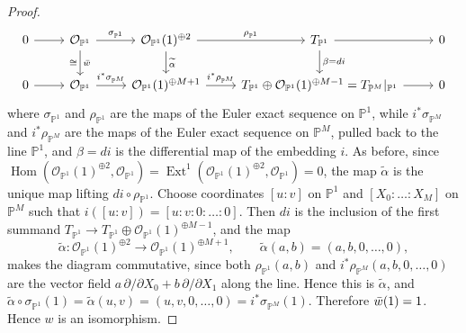 \documentclass[11pt,twoside]{amsart}
\theoremstyle{plain}
\theoremstyle{definition}
\newcommand{\PP}{\mathbb{P}}
\newcommand{\PM}{\mathbb{P}^M}
\newcommand{\OO}{\mathcal{O}}
\newcommand{\Hom}{\operatorname{Hom}}
\newcommand{\Ext}{\operatorname{Ext}}
\begin{document}
\begin{proof}
\[
\begin{tikzcd}
  0 \arrow[r] & \OO_{\PP^1} \arrow[r, "\sigma_{\PP^1}"] \arrow[d, "\Bar{w}", "\cong"'] & \OO_{\PP^1}(1)^{\oplus 2} \arrow[r, "\rho_{\PP^1}"] \arrow[d, "\widetilde{\alpha}"] & T_{\PP^1} \arrow[r] \arrow[d, "\beta = di"] & 0 \\
   0 \arrow[r] & \OO_{\PP^1} \arrow[r, "i^*\sigma_{\PM}"] & \OO_{\PP^1}(1)^{\oplus M+1} \arrow[r, "i^*\rho_{\PM}"] & T_{\PP^1} \oplus \OO_{\PP^1}(1)^{\oplus M-1} = T_{\PM}|_{\PP^1} \arrow[r] & 0
\end{tikzcd}
\]
where $\sigma_{\PP^1}$ and $\rho_{\PP^1}$ are the maps of the Euler exact sequence on $\PP^1$, while $i^*\sigma_{\PM}$ and $i^*\rho_{\PM}$ are the maps of the Euler exact sequence on $\PM$, pulled back to the line $\PP^1$, and $\beta=di$ is the differential map of the embedding $i$. As before, since $\Hom(\OO_{\PP^1}(1)^{\oplus 2},\OO_{\PP^1})=\Ext^1(\OO_{\PP^1}(1)^{\oplus 2},\OO_{\PP^1})=0$, the map $\widetilde{\alpha}$ is the unique map lifting $di\circ\rho_{\PP^1}$. Choose coordinates $[u:v]$ on $\PP^1$ and $[X_0:\dots:X_M]$ on $\PM$ such that $i([u:v])=[u:v:0:\dots:0]$. Then $di$ is the inclusion of the first summand $T_{\PP^1}\to T_{\PP^1}\oplus\OO_{\PP^1}(1)^{\oplus M-1}$, and the map
\[
\widetilde\alpha\colon\OO_{\PP^1}(1)^{\oplus 2}\longrightarrow\OO_{\PP^1}(1)^{\oplus M+1},\qquad \widetilde\alpha(a,b)=(a,b,0,\dots,0),
\]
makes the diagram commutative, since both $\rho_{\PP^1}(a,b)$ and $i^*\rho_{\PM}(a,b,0,\dots,0)$ are the vector field $a\,\partial/\partial X_0+b\,\partial/\partial X_1$ along the line. Hence this is $\widetilde\alpha$, and $\widetilde{\alpha}\circ\sigma_{\PP^1}(1)=\widetilde{\alpha}(u,v)=(u,v,0,\dots,0)=i^*\sigma_{\PM}(1)$. Therefore $\Bar{w}(1)=1$. Hence $w$ is an isomorphism.


\end{proof}
\end{document}
